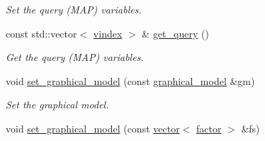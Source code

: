\begin{DoxyCompactItemize}
\begin{DoxyCompactList}\small\item\em Set the query (M\+AP) variables. \end{DoxyCompactList}\item 
const std\+::vector$<$ \hyperlink{classmerlin_1_1bte_afd42180c7906586fb39a0384d096fa4a}{vindex} $>$ \& \hyperlink{classmerlin_1_1bte_a9c22516f61366677d52ddf8488982a84}{get\+\_\+query} ()\hypertarget{classmerlin_1_1bte_a9c22516f61366677d52ddf8488982a84}{}\label{classmerlin_1_1bte_a9c22516f61366677d52ddf8488982a84}

\begin{DoxyCompactList}\small\item\em Get the query (M\+AP) variables. \end{DoxyCompactList}\item 
void \hyperlink{classmerlin_1_1bte_a894ed86f01f0956504bcab46d570e854}{set\+\_\+graphical\+\_\+model} (const \hyperlink{classmerlin_1_1graphical__model}{graphical\+\_\+model} \&gm)\hypertarget{classmerlin_1_1bte_a894ed86f01f0956504bcab46d570e854}{}\label{classmerlin_1_1bte_a894ed86f01f0956504bcab46d570e854}

\begin{DoxyCompactList}\small\item\em Set the graphical model. \end{DoxyCompactList}\item 
void \hyperlink{classmerlin_1_1bte_a5a74cf3c8ba655bba3c102147a5f25df}{set\+\_\+graphical\+\_\+model} (const \hyperlink{classmerlin_1_1vector}{vector}$<$ \hyperlink{classmerlin_1_1factor}{factor} $>$ \&fs)\hypertarget{classmerlin_1_1bte_a5a74cf3c8ba655bba3c102147a5f25df}{}\label{classmerlin_1_1bte_a5a74cf3c8ba655bba3c102147a5f25df}


\end{DoxyCompactItemize}
